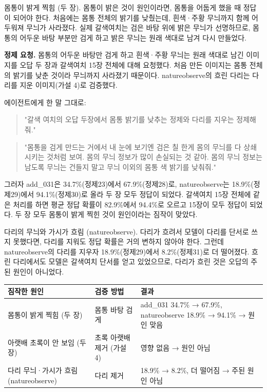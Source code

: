 \documentclass[11pt]{article}
\begin{document}
몸통이 밝게 찍힘 (두 장). 몸통이 밝은 것이 원인이라면, 몸통을 어둡게 했을 때 정답이 되어야 한다. 처음에는 몸통 전체의 밝기를 낮췄는데, 흰색·주황 무늬까지 함께 어두워져 무늬가 사라졌다. 실제 갈색여치는 검은 바탕 위에 밝은 무늬가 선명하므로, 몸통의 어두운 바탕 부분만 검게 하고 밝은 무늬는 원래 색대로 남겨 다시 만들었다.

\textbf{정제 요청.} 몸통의 어두운 바탕만 검게 하고 흰색·주황 무늬는 원래 색대로 남긴 이미지를 오답 두 장과 갈색여치 15장 전체에 대해 요청했다. 처음 만든 이미지는 몸통 전체의 밝기를 낮춘 것이라 무늬까지 사라졌기 때문이다. natureobserve의 흐린 다리는 다리를 지운 이미지(가설 4)로 검증했다.

에이전트에게 한 말 그대로:
\begin{quote}
"갈색 여치의 오답 두장에서 몸통 밝기를 낮추는 정제와 다리를 지우는 정제해줘."
\end{quote}
\begin{quote}
"몸통을 검게 만드는 거에서 내 눈에 보기엔 검은 칠 한게 몸의 무늬를 다 상쇄시키는 것처럼 보여. 몸의 무늬 정보가 많이 손실되는 것 같아. 몸의 무늬 정보는 남도록 무늬는 건들지 말고 무늬 이외의 몸통 색 밝기를 낮춰줘."
\end{quote}

그러자 add\_031은 34.7\%(정제23)에서 67.9\%(정제28)로, natureobserve는 18.9\%(정제29)에서 94.1\%(정제30)로 올라 두 장 모두 정답이 되었다. 갈색여치 15장 전체에 같은 처리를 하면 평균 정답 확률이 82.9\%에서 94.4\%로 오르고 15장이 모두 정답이 되었다. 두 장 모두 몸통이 밝게 찍힌 것이 원인이라는 짐작이 맞았다.

다리의 무늬와 가시가 흐림 (natureobserve). 다리가 흐려서 모델이 다리를 단서로 쓰지 못했다면, 다리를 지워도 정답 확률은 거의 변하지 않아야 한다. 그런데 natureobserve의 다리를 지우자 18.9\%(정제29)에서 8.2\%(정제31)로 더 떨어졌다. 흐린 다리에서도 모델은 갈색여치 단서를 얻고 있었으므로, 다리가 흐린 것은 오답의 주된 원인이 아니었다.

\begin{center}\footnotesize
\begin{tabular}{lll}
\toprule
짐작한 원인 & 검증 방법 & 결과 \\
\midrule
몸통이 밝게 찍힘 (두 장) & 몸통 바탕 검게 & add\_031 34.7\% → 67.9\%, natureobserve 18.9\% → 94.1\% → 원인 맞음 \\
아랫배 초록이 안 보임 (두 장) & 초록 아랫배 제거 (가설 4) & 영향 없음 → 원인 아님 \\
다리 무늬·가시가 흐림 (natureobserve) & 다리 제거 & 18.9\% → 8.2\%, 더 떨어짐 → 주된 원인 아님 \\
\bottomrule
\end{tabular}
\end{center}
\end{document}
